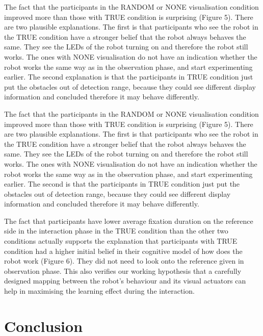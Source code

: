 \documentclass{sig-alternate}
\begin{document}
The fact that the participants in the {\sf RANDOM} or {\sf NONE} visualisation
condition improved more than those with {\sf TRUE} condition is surprising
(Figure 5). There are two plausible explanations. The first is that participants
who see the robot in the {\sf TRUE} condition have a stronger belief that the
robot always behaves the same. They see the LEDs of the robot turning on and
therefore the robot still works. The ones with {\sf NONE} visualisation do not
have an indication whether the robot works the same way as in the observation
phase, and start experimenting earlier. The second explanation is that the
participants in {\sf TRUE} condition just put the obstacles out of detection
range, because they could see different display information and concluded
therefore it may behave differently.

The fact that the participants in the {\sf RANDOM} or {\sf NONE} visualisation
condition improved more than those with {\sf TRUE} condition is surprising
(Figure 5). There are two plausible explanations. The first is that
participants who see the robot in the {\sf TRUE} condition have a stronger
belief that the robot always behaves the same. They see the LEDs of the
robot turning on and therefore the robot still works. The ones with {\sf NONE}
visualisation do not have an indication whether the robot works the same
way as in the observation phase, and start experimenting earlier. The
second is that the participants in {\sf TRUE} condition just put the obstacles
out of detection range, because they could see different display
information and concluded therefore it may behave differently.

The fact that participants have lower average fixation duration on the
reference side in the interaction phase in the {\sf TRUE} condition than the
other two conditions actually supports the explanation that participants
with {\sf TRUE} condition had a higher initial belief in their cognitive model
of how does the robot work (Figure 6). They did not need to look onto
the reference given in observation phase. This also verifies our working
hypothesis that a carefully designed mapping between the robot's
behaviour and its visual actuators can help in maximising the learning
effect during the interaction.


\section{Conclusion}
\label{conclusion}
\end{document}
